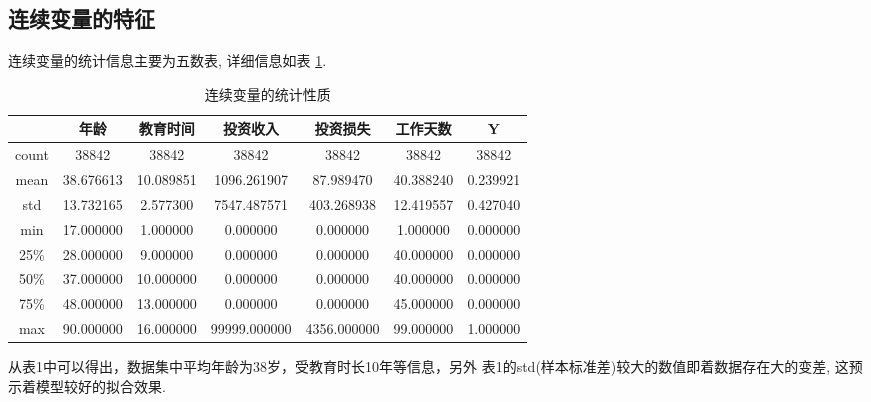 \documentclass[12pt]{article}
\begin{document}
\subsection{连续变量的特征}
连续变量的统计信息主要为五数表, 详细信息如表 \ref{'Continuous Five Number'}. 

\begin{table}[!ht]
	\centering
	\makeatletter
	\renewcommand{\arraystretch}{1.25}
	\def\@captype{table}
	\setlength{\abovecaptionskip}{0pt}
	\setlength{\belowcaptionskip}{10pt}
	\caption{连续变量的统计性质}
	\begin{tabular}{c|c c c c c c}
		\toprule[1.5pt]
		~&年龄 & 教育时间 & 投资收入 & 投资损失 & 工作天数 & Y \\ 
		\toprule[1.5pt]
		count & 38842 & 38842 & 38842 & 38842 & 38842 & 38842 \\ 
		mean & 38.676613 & 10.089851 & 1096.261907 & 87.989470 & 40.388240 & 0.239921 \\ 
		std & 13.732165 & 2.577300 & 7547.487571 & 403.268938 & 12.419557 & 0.427040 \\ 
		min & 17.000000 & 1.000000 & 0.000000 & 0.000000 & 1.000000 & 0.000000 \\ 
		25\% & 28.000000 & 9.000000 & 0.000000 & 0.000000 & 40.000000 & 0.000000 \\ 
		50\% & 37.000000 & 10.000000 & 0.000000 & 0.000000 & 40.000000 & 0.000000 \\ 
		75\% & 48.000000 & 13.000000 & 0.000000 & 0.000000 & 45.000000 & 0.000000 \\
		max & 90.000000 & 16.000000 & 99999.000000 & 4356.000000 & 99.000000 & 1.000000 \\ 
	\toprule[1.5pt]
	\end{tabular}
	\label{'Continuous Five Number'}
\end{table}
从表1中可以得出，数据集中平均年龄为38岁，受教育时长10年等信息，另外
表1的std(样本标准差)较大的数值即着数据存在大的变差, 这预示着模型较好的拟合效果. \par 
\end{document}
